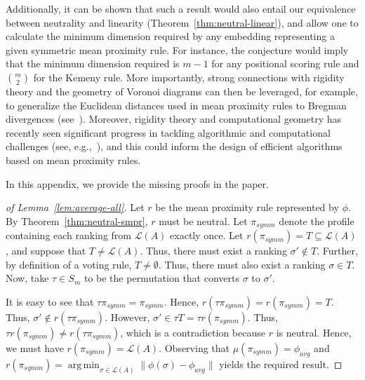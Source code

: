 \documentclass[prodmode,acmec]{ec-acmsmall}
\newcommand{\calL}{{\mathcal{L}}}
\newcommand{\rank}{{\calL(A)}}
\DeclareMathOperator*{\argmin}{arg\,min}
\begin{document}
Additionally, it can be shown that such a result would also entail our equivalence between neutrality and linearity (Theorem~\ref{thm:neutral-linear}), and allow one to calculate the minimum dimension required by any embedding representing a given symmetric mean proximity rule. For instance, the conjecture would imply that the minimum dimension required is $m-1$ for any positional scoring rule and $\binom{m}{2}$ for the Kemeny rule.  More importantly, strong connections with rigidity theory and the geometry of Voronoi diagrams can then be leveraged, for example, to generalize the Euclidean distances used in mean proximity rules to Bregman divergences (see~\cite{boissonnat2010bregman}). Moreover, rigidity theory and computational geometry has recently seen significant progress in tackling algorithmic and computational challenges (see, e.g.,~\cite{biedl2007cauchy}), and this could inform the design of efficient algorithms based on mean proximity rules. 






\elecappendix
\medskip

In this appendix, we provide the missing proofs in the paper.

\begin{proof}[of Lemma~\ref{lem:average-all}]
Let $r$ be the mean proximity rule represented by $\phi$. By Theorem~\ref{thm:neutral-smpr}, $r$ must be neutral. Let $\pi_{symm}$ denote the profile containing each ranking from $\rank$ exactly once. Let $r(\pi_{symm}) = T \subseteq \rank$, and suppose that $T \neq \rank$. Thus, there must exist a ranking $\sigma' \notin T$. Further, by definition of a voting rule, $T \neq \emptyset$. Thus, there must also exist a ranking $\sigma \in T$. Now, take $\tau \in S_m$ to be the permutation that converts $\sigma$ to $\sigma'$. 

It is easy to see that $\tau \pi_{symm} = \pi_{symm}$. Hence, $r(\tau \pi_{symm}) = r(\pi_{symm}) = T$. Thus, $\sigma' \notin r(\tau \pi_{symm})$. However, $\sigma' \in \tau T = \tau r(\pi_{symm})$. Thus, $\tau r(\pi_{symm}) \neq r(\tau \pi_{symm})$, which is a contradiction because $r$ is neutral. Hence, we must have $r(\pi_{symm}) = \rank$. Observing that $\mu(\pi_{symm}) = \phi_{avg}$ and $r(\pi_{symm}) = \argmin_{\sigma \in \rank} \|\phi(\sigma)-\phi_{avg}\|$ yields the required result.
\end{proof}
\end{document}
